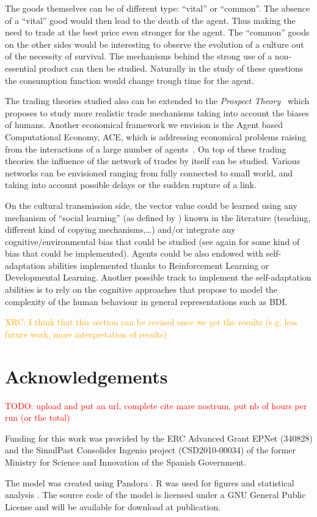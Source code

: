 \documentclass{wscpaperproc}
\newcommand{\memo}[2]{\textcolor{#1}{#2}}
\newcommand{\todo}[1]{\memo{red}{TODO: #1\\}}
\newcommand{\xrc}[1]{\memo{orange}{XRC: #1\\}}
\begin{document}
The goods themselves can be of different type: ``vital'' or ``common''. The absence of a ``vital'' good would then lead to the death of the agent. Thus making the need to trade at the best price even stronger for the agent. The ``common'' goods on the other sides would be interesting to observe the evolution of a culture out of the necessity of survival. The mechanisms behind the strong use of a non-essential product can then be studied. Naturally in the study of these questions the consumption function would change trough time for the agent.

The trading theories studied also can be extended to the \emph{Prospect Theory}~ which proposes to study more realistic trade mechanisms taking into account the biases of humans. Another economical framework we envision is the Agent based Computational Economy, ACE, which is  addressing economical problems raising from the interactions of a large number of agents~. On top of these trading theories the influence of the network of trades by itself can be studied. Various networks can be envisioned ranging from fully connected to small world, and taking into account possible delays or the sudden rupture of a link.

On the cultural transmission side, the vector value could be learned using any mechanism of ``social learning'' (as defined by ) known in the literature (teaching, different kind of copying mechanisms,\ldots) and/or integrate any cognitive/environmental bias that could be studied (see again  for some kind of bias that could be implemented). Agents could be also endowed with self-adaptation abilities implemented thanks to Reinforcement Learning or Developmental Learning. Another possible track to implement the self-adaptation abilities is to rely on the cognitive approaches that propose to model the complexity of the human behaviour in general representations such as BDI.

\xrc{I think that this section can be revised once we get the results (e.g. less future work, more interpretation of results)}

\section{Acknowledgements}

\todo{upload and put an url, complete cite mare nostrum, put nb of hours per run (or the total)}

Funding for this work was provided by the ERC Advanced Grant EPNet (340828) and the SimulPast Consolider Ingenio project (CSD2010-00034) of the former Ministry for Science and Innovation of the Spanish Government. 

The model was created using Pandora . R was used for figures and statistical analysis . The source code of the model is licensed under a GNU General Public License and will be available for download at publication.


  
\end{document}
